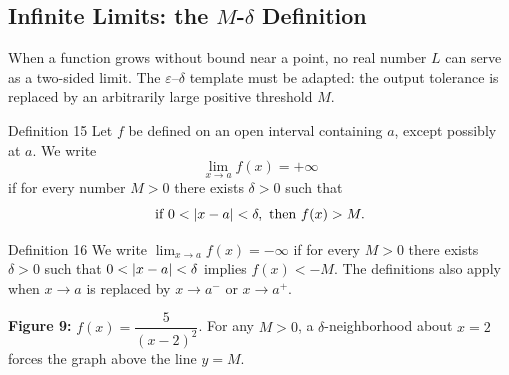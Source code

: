 \subsection*{Infinite Limits: the \texorpdfstring{\(M\)-\(\delta\)}{M-delta} Definition}
\label{subsec:1.4.5}

When a function grows without bound near a point, no real number \(L\) can serve as a two-sided limit. The \(\varepsilon\)--\(\delta\) template must be adapted: the output tolerance is replaced by an arbitrarily large positive threshold \(M\).

\begin{definitionbox}{Definition 15}
Let \(f\) be defined on an open interval containing \(a\), except possibly at \(a\). We write
\[
\lim_{x \to a} f(x) = +\infty
\]
if for every number \(M > 0\) there exists \(\delta > 0\) such that
\[
\text{if } 0 < \left|x - a\right| < \delta,\text{ then } f(x) > M.
\]
\end{definitionbox}

\begin{definitionbox}{Definition 16}
We write \(\lim_{x \to a} f(x) = -\infty\) if for every \(M > 0\) there exists \(\delta > 0\) such that \(0 < \left|x - a\right| < \delta\) implies \(f(x) < -M\). The definitions also apply when \(x \to a\) is replaced by \(x \to a^{-}\) or \(x \to a^{+}\).
\end{definitionbox}

\begin{center}

\smallskip
\textbf{Figure 9:} \(f(x) = \dfrac{5}{(x-2)^{2}}\). For any \(M > 0\), a \(\delta\)-neighborhood about \(x = 2\) forces the graph above the line \(y = M\).
\end{center}

